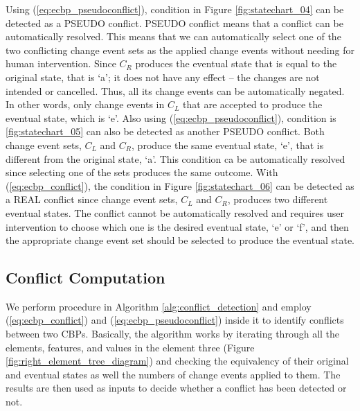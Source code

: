 Using (\ref{eq:ecbp_pseudoconflict}), condition in Figure \ref{fig:statechart_04} can be detected as a \textsf{PSEUDO} conflict. \textsf{PSEUDO} conflict means that a conflict can be automatically resolved. This means that we can automatically select one of the two conflicting change event sets as the applied change events without needing for human intervention. Since $C_{R}$ produces the eventual state that is equal to the original state, that is `a'; it does not have any effect -- the changes are not intended or cancelled. Thus, all its change events can be automatically negated. In other words, only change events in $C_{L}$ that are accepted to produce the eventual state, which is `e'. Also using (\ref{eq:ecbp_pseudoconflict}), condition is \ref{fig:statechart_05} can also be detected as another \textsf{PSEUDO} conflict. Both change event sets, $C_{L}$ and $C_{R}$, produce the same eventual state, `e', that is different from the original state, `a'. This condition ca be automatically resolved since selecting one of the sets produces the same outcome. With (\ref{eq:ecbp_conflict}), the condition in Figure \ref{fig:statechart_06} can be detected as a \textsf{REAL} conflict since change event sets, $C_{L}$ and $C_{R}$, produces two different eventual states. The conflict cannot be automatically resolved and requires user intervention to choose which one is the desired eventual state, `e' or `f', and then the appropriate change event set should be selected to produce the eventual state.


\subsection{Conflict Computation} 
\label{sec:conflict_computation} 
We perform procedure in Algorithm \ref{alg:conflict_detection} and employ (\ref{eq:ecbp_conflict}) and (\ref{eq:ecbp_pseudoconflict}) inside it to identify conflicts between two CBPs. Basically, the algorithm works by iterating through all the elements, features, and values in the element three (Figure \ref{fig:right_element_tree_diagram}) and checking the equivalency of their original and eventual states as well the numbers of change events applied to them. The results are then used as inputs to decide whether a conflict has been detected or not.

